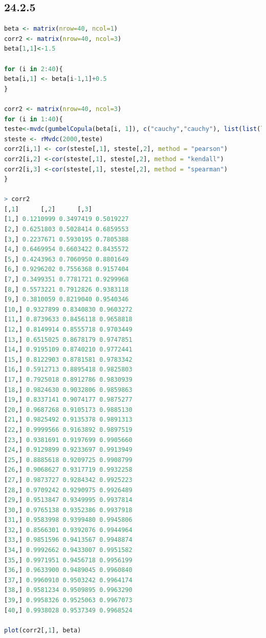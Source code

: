 \documentclass[12pt]{article}
\begin{document}
\subsection*{24.2.5}

\begin{lstlisting}[language=R]
beta <- matrix(nrow=40, ncol=1)
corr2 <- matrix(nrow=40, ncol=3)
beta[1,1]<-1.5

for (i in 2:40){
beta[i,1] <- beta[i-1,1]+0.5
}

corr2 <- matrix(nrow=40, ncol=3)
for (i in 1:40){
teste<-mvdc(gumbelCopula(beta[i, 1]), c("cauchy","cauchy"), list(list(location=0,scale=1),list(location=0,scale=1)))
steste <- rMvdc(2000,teste)
corr2[i,1] <- cor(steste[,1], steste[,2], method = "pearson")
corr2[i,2] <-cor(steste[,1], steste[,2], method = "kendall")
corr2[i,3] <-cor(steste[,1], steste[,2], method = "spearman")
}

> corr2
[,1]      [,2]      [,3]
[1,] 0.1210999 0.3497419 0.5019227
[2,] 0.6251803 0.5028414 0.6859553
[3,] 0.2237671 0.5930195 0.7805388
[4,] 0.6469954 0.6603422 0.8435572
[5,] 0.4243963 0.7060950 0.8801649
[6,] 0.9296202 0.7556368 0.9157404
[7,] 0.3499351 0.7781721 0.9299968
[8,] 0.5573221 0.7912826 0.9383118
[9,] 0.3810059 0.8219040 0.9540346
[10,] 0.9327899 0.8340830 0.9603272
[11,] 0.8739633 0.8456118 0.9658818
[12,] 0.8149914 0.8555718 0.9703449
[13,] 0.6515025 0.8678179 0.9747851
[14,] 0.9195109 0.8740210 0.9772441
[15,] 0.8122903 0.8781581 0.9783342
[16,] 0.5912713 0.8895418 0.9825803
[17,] 0.7925018 0.8912786 0.9830939
[18,] 0.9824630 0.9032806 0.9859863
[19,] 0.8337141 0.9074177 0.9875277
[20,] 0.9687268 0.9105173 0.9885130
[21,] 0.9825492 0.9135378 0.9891313
[22,] 0.9999566 0.9163892 0.9897519
[23,] 0.9381691 0.9197699 0.9905660
[24,] 0.9129899 0.9233697 0.9913949
[25,] 0.8885618 0.9209725 0.9908799
[26,] 0.9068627 0.9317719 0.9932258
[27,] 0.9873727 0.9284342 0.9925223
[28,] 0.9709242 0.9290975 0.9926489
[29,] 0.9513847 0.9349995 0.9937814
[30,] 0.9765138 0.9352386 0.9937918
[31,] 0.9583998 0.9399480 0.9945806
[32,] 0.8566301 0.9392076 0.9944964
[33,] 0.9851596 0.9413567 0.9948874
[34,] 0.9992662 0.9433007 0.9951582
[35,] 0.9971951 0.9456718 0.9956199
[36,] 0.9633900 0.9489045 0.9960840
[37,] 0.9960910 0.9503242 0.9964174
[38,] 0.9581234 0.9509895 0.9963290
[39,] 0.9958326 0.9525063 0.9967073
[40,] 0.9938028 0.9537349 0.9968524

plot(corr2[,1], beta)
\end{lstlisting}
\end{document}
